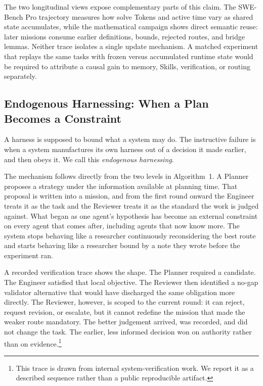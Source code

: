 The two longitudinal views expose complementary parts of this claim. The SWE-Bench
Pro trajectory measures how solve Tokens and active time vary as shared state
accumulates, while the mathematical campaign shows direct semantic reuse: later
missions consume earlier definitions, bounds, rejected routes, and bridge lemmas.
Neither trace isolates a single update mechanism. A matched experiment that replays
the same tasks with frozen versus accumulated runtime state would be required to
attribute a causal gain to memory, Skills, verification, or routing separately.

\subsection{Endogenous Harnessing: When a Plan Becomes a Constraint}
\label{sec:endogenous-harness}

A harness is supposed to bound what a system may do. The instructive failure is when
a system manufactures its own harness out of a decision it made earlier, and then
obeys it. We call this \emph{endogenous harnessing}.

The mechanism follows directly from the two levels in Algorithm~1. A Planner proposes
a strategy under the information available at planning time. That proposal is written
into a mission, and from the first round onward the Engineer treats it as the task and
the Reviewer treats it as the standard the work is judged against. What began as one
agent's hypothesis has become an external constraint on every agent that comes after,
including agents that now know more. The system stops behaving like a researcher
continuously reconsidering the best route and starts behaving like a researcher bound
by a note they wrote before the experiment ran.

A recorded verification trace shows the shape. The Planner required a
 candidate. The Engineer satisfied that local objective. The Reviewer
then identified a no-gap validator alternative that would have discharged the same
obligation more directly. The Reviewer, however, is scoped to the current round: it
can reject, request revision, or escalate, but it cannot redefine the mission that
made the weaker route mandatory. The better judgement arrived, was recorded, and did
not change the task. The earlier, less informed decision won on authority rather than
on evidence.\footnote{This trace is drawn from internal system-verification work. We
report it as a described sequence rather than a public reproducible artifact.}

